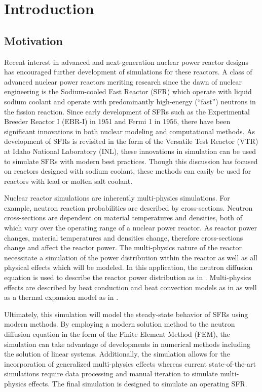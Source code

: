 \chapter{Introduction}
\label{ch:introduction}

\section{Motivation}
  Recent interest in advanced and next-generation nuclear power reactor designs
  has encouraged further development of simulations for these reactors. A class
  of advanced nuclear power reactors meriting research since the dawn 
  of nuclear engineering is the Sodium-cooled Fast Reactor (SFR) which operate
  with liquid sodium coolant and operate with predominantly high-energy 
  (``fast'') neutrons in the fission reaction. Since early development of SFRs 
  such as the Experimental
  Breeder Reactor I (EBR-I) in 1951 and Fermi 1 in 1956, there have been
  significant innovations in both nuclear modeling and computational methods. As
  development of SFRs is revisited in the form of the Versatile Test Reactor
  (VTR) at Idaho National Laboratory (INL), these innovations in simulation can
  be used to simulate SFRs with modern best practices.
  Though this discussion has focused on reactors designed with sodium coolant,
  these methods can easily be used for reactors with lead or molten salt
  coolant.

  Nuclear reactor simulations are inherently multi-physics simulations. For
  example, neutron reaction probabilities are described by cross-sections.
  Neutron cross-sections are dependent on material temperatures and densities,
  both of which vary over the operating range of a nuclear power reactor. As
  reactor power changes, material temperatures and densities change, therefore
  cross-sections change and affect the reactor power. The multi-physics nature
  of the reactor necessitate a simulation of the power distribution within the
  reactor as well as all physical effects which will be modeled. In this
  application, the neutron diffusion equation is used to describe the reactor
  power distribution as in . Multi-physics effects
  are described by heat conduction and heat convection models as in
   as well as a thermal expansion model as in
  .

  Ultimately, this simulation will model the steady-state behavior of SFRs using
  modern methods. By employing a modern solution method to the neutron diffusion
  equation in the form of the Finite Element Method (FEM), the simulation can
  take advantage of developments in numerical methods including the solution of
  linear systems. Additionally, the simulation allows for the incorporation of
  generalized multi-physics effects whereas current state-of-the-art simulations
  require data processing and manual iteration to simulate multi-physics 
  effects. The final simulation is designed to simulate an operating SFR.

